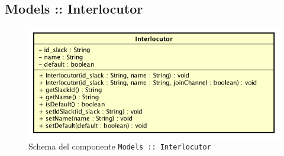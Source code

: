 \documentclass[../ManualeSviluppatore_v2.0.0.tex]{subfiles}
\begin{document}
	\newpage
	\subsection{Models :: Interlocutor}
	\begin{figure}[!h]
		\centering
		\includegraphics[scale=0.6]{Architettura/Front-End/Models/Interlocutor.png}
		\caption{Schema del componente \texttt{Models :: Interlocutor}}
	\end{figure}
\end{document}
